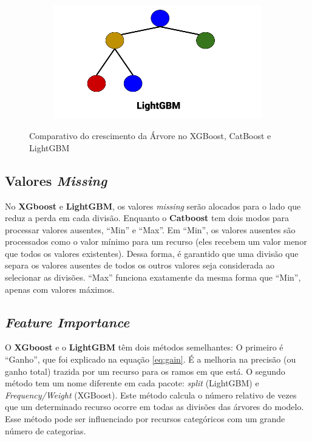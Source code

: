 \begin{figure}[H]
\begin{subfigure}[b]{0.4\textwidth}
     \end{subfigure}
     \hfill
     \begin{subfigure}[b]{0.4\textwidth}
         \centering
         \includegraphics[width=\textwidth]{images/LGBM.png}
     \end{subfigure}
        \caption{Comparativo do crescimento da Árvore no XGBoost, CatBoost e LightGBM}
        \label{fig:three graphs}
\end{figure}


\subsection{Valores \textit{Missing}}
No \textbf{XGboost} e \textbf{LightGBM}, os valores \textit{missing} serão alocados para o lado que reduz a perda em cada divisão. Enquanto o \textbf{Catboost} tem dois modos para processar valores ausentes, “Min” e “Max”. Em “Min”, os valores ausentes são processados como o valor mínimo para um recurso (eles recebem um valor menor que todos os valores existentes). Dessa forma, é garantido que uma divisão que separa os valores ausentes de todos os outros valores seja considerada ao selecionar as divisões. “Max” funciona exatamente da mesma forma que “Min”, apenas com valores máximos.

\subsection{\textit{Feature Importance}}
O \textbf{XGboost} e o \textbf{LightGBM} têm dois métodos semelhantes: O primeiro é “Ganho”, que foi explicado na equação \ref{eq:gain}. É a melhoria na precisão (ou ganho total) trazida por um recurso para os ramos em que está. O segundo método tem um nome diferente em cada pacote: \textit{split} (LightGBM) e \textit{Frequency/Weight} (XGBoost). Este método calcula o número relativo de vezes que um determinado recurso ocorre em todas as divisões das árvores do modelo. Esse método pode ser influenciado por recursos categóricos com um grande número de categorias.

